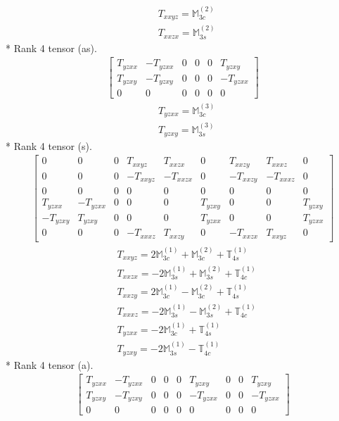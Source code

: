 \documentclass[fleqn,8pt,landscape]{jsarticle}
\begin{document}
\begin{align*}
& T_{xxyz} = \mathbb{M}_{3c}^{(2)} \\
& T_{xxzx} = \mathbb{M}_{3s}^{(2)}
\end{align*}
* Rank 4 tensor (as).
\begin{align*}
\begin{bmatrix} T_{yzxx} & - T_{yzxx} & 0 & 0 & 0 & T_{yzxy} \\ T_{yzxy} & - T_{yzxy} & 0 & 0 & 0 & - T_{yzxx} \\ 0 & 0 & 0 & 0 & 0 & 0 \end{bmatrix}
\end{align*}
\begin{align*}
& T_{yzxx} = \mathbb{M}_{3c}^{(3)} \\
& T_{yzxy} = \mathbb{M}_{3s}^{(3)}
\end{align*}
* Rank 4 tensor (s).
\begin{align*}
\begin{bmatrix} 0 & 0 & 0 & T_{xxyz} & T_{xxzx} & 0 & T_{xxzy} & T_{xxxz} & 0 \\ 0 & 0 & 0 & - T_{xxyz} & - T_{xxzx} & 0 & - T_{xxzy} & - T_{xxxz} & 0 \\ 0 & 0 & 0 & 0 & 0 & 0 & 0 & 0 & 0 \\ T_{yzxx} & - T_{yzxx} & 0 & 0 & 0 & T_{yzxy} & 0 & 0 & T_{yzxy} \\ - T_{yzxy} & T_{yzxy} & 0 & 0 & 0 & T_{yzxx} & 0 & 0 & T_{yzxx} \\ 0 & 0 & 0 & - T_{xxxz} & T_{xxzy} & 0 & - T_{xxzx} & T_{xxyz} & 0 \end{bmatrix}
\end{align*}
\begin{align*}
& T_{xxyz} = 2 \mathbb{M}_{3c}^{(1)} + \mathbb{M}_{3c}^{(2)} + \mathbb{T}_{4s}^{(1)} \\
& T_{xxzx} = - 2 \mathbb{M}_{3s}^{(1)} + \mathbb{M}_{3s}^{(2)} + \mathbb{T}_{4c}^{(1)} \\
& T_{xxzy} = 2 \mathbb{M}_{3c}^{(1)} - \mathbb{M}_{3c}^{(2)} + \mathbb{T}_{4s}^{(1)} \\
& T_{xxxz} = - 2 \mathbb{M}_{3s}^{(1)} - \mathbb{M}_{3s}^{(2)} + \mathbb{T}_{4c}^{(1)} \\
& T_{yzxx} = - 2 \mathbb{M}_{3c}^{(1)} + \mathbb{T}_{4s}^{(1)} \\
& T_{yzxy} = - 2 \mathbb{M}_{3s}^{(1)} - \mathbb{T}_{4c}^{(1)}
\end{align*}
* Rank 4 tensor (a).
\begin{align*}
\begin{bmatrix} T_{yzxx} & - T_{yzxx} & 0 & 0 & 0 & T_{yzxy} & 0 & 0 & T_{yzxy} \\ T_{yzxy} & - T_{yzxy} & 0 & 0 & 0 & - T_{yzxx} & 0 & 0 & - T_{yzxx} \\ 0 & 0 & 0 & 0 & 0 & 0 & 0 & 0 & 0 \end{bmatrix}
\end{align*}
\end{document}
